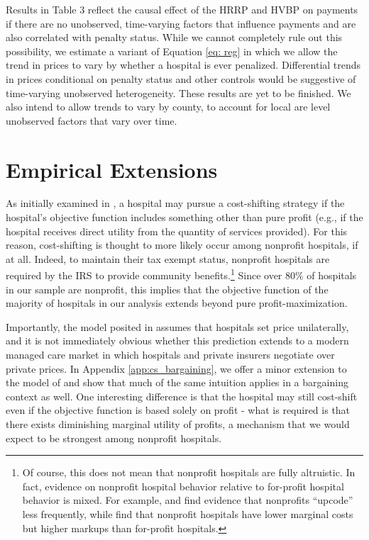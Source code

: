 \documentclass[12pt]{article}
\begin{document}
Results in Table 3 reflect the causal effect of the HRRP and HVBP on payments if there are no unobserved, time-varying factors that influence payments and are also correlated with penalty status.  While we cannot completely rule out this possibility, we estimate  a variant of Equation \ref{eq: reg} in which we allow the trend in prices to vary by whether a hospital is ever penalized.  Differential trends in prices conditional on penalty status and other controls would be suggestive of time-varying unobserved heterogeneity.  These results are yet to be finished.  We also intend to allow trends to vary by county, to account for local are level unobserved factors that vary over time.





\section{Empirical Extensions}
\label{sec:Ext}

As initially examined in \cite{dranove1988}, a hospital may pursue a cost-shifting strategy if the hospital's objective function includes something other than pure profit (e.g., if the hospital receives direct utility from the quantity of services provided). For this reason, cost-shifting is thought to more likely occur among nonprofit hospitals, if at all. Indeed, to maintain their tax exempt status, nonprofit hospitals are required by the IRS to provide community benefits.\footnote{Of course, this does not mean that nonprofit hospitals are fully altruistic. In fact, evidence on nonprofit hospital behavior relative to for-profit hospital behavior is mixed. For example, \cite{silverman2004} and \cite{dafny2005} find evidence that nonprofits ``upcode'' less frequently, while \cite{gaynor2003} find that nonprofit hospitals have lower marginal costs but higher markups than for-profit hospitals.} Since over 80$\%$ of hospitals in our sample are nonprofit, this implies that the objective function of the majority of hospitals in our analysis extends beyond pure profit-maximization.

Importantly, the model posited in \cite{dranove1988} assumes that hospitals set price unilaterally, and it is not immediately obvious whether this prediction extends to a modern managed care market in which hospitals and private insurers negotiate over private prices. In Appendix \ref{app:cs_bargaining}, we offer a minor extension to the model of \cite{dranove1988} and show that much of the same intuition applies in a bargaining context as well. One interesting difference is that the hospital may still cost-shift even if the objective function is based solely on profit - what is required is that there exists diminishing marginal utility of profits, a mechanism that we would expect to be strongest among nonprofit hospitals.
\end{document}
